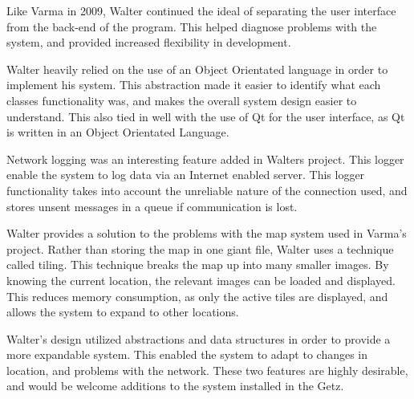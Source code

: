 Like Varma in 2009, Walter continued the ideal of separating the user interface from the back-end of the program. This helped diagnose problems with the system, and provided increased flexibility in development.

Walter heavily relied on the use of an Object Orientated language in order to implement his system. This abstraction made it easier to identify what each classes functionality was, and makes the overall system design easier to understand. This also tied in well with the use of Qt for the user interface, as Qt is written in an Object Orientated Language.

Network logging was an interesting feature added in Walters project. This logger enable the system to log data via an Internet enabled server. This logger functionality takes into account the unreliable nature of the connection used, and stores unsent messages in a queue if communication is lost.

Walter provides a solution to the problems with the map system used in Varma's project. Rather than storing the map in one giant file, Walter uses a technique called tiling. This technique breaks the map up into many smaller images. By knowing the current location, the relevant images can be loaded and displayed. This reduces memory consumption, as only the active tiles are displayed, and allows the system to expand to other locations.

Walter's design utilized abstractions and data structures in order to provide a more expandable system. This enabled the system to adapt to changes in location, and problems with the network. These two features are highly desirable, and would be welcome additions to the system installed in the Getz.





